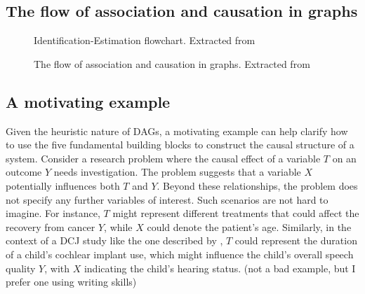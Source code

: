 \documentclass[
  authoryear,
  preprint,
  1p]{elsarticle}
\begin{document}
\subsection{The flow of association and causation in
graphs}\label{sec-framework-flow}

\begin{figure}


\caption{\label{fig-IEflow}Identification-Estimation flowchart.
Extracted from \citet[32]{Neal_2020}}

\end{figure}%

\begin{figure}


\caption{\label{fig-ACflow}The flow of association and causation in
graphs. Extracted from \citet[31]{Neal_2020}}

\end{figure}%

\subsection{A motivating example}\label{sec-framework-example}

Given the heuristic nature of DAGs, a motivating example can help
clarify how to use the five fundamental building blocks to construct the
causal structure of a system. Consider a research problem where the
causal effect of a variable \(T\) on an outcome \(Y\) needs
investigation. The problem suggests that a variable \(X\) potentially
influences both \(T\) and \(Y\). Beyond these relationships, the problem
does not specify any further variables of interest. Such scenarios are
not hard to imagine. For instance, \(T\) might represent different
treatments that could affect the recovery from cancer \(Y\), while \(X\)
could denote the patient's age. Similarly, in the context of a DCJ study
like the one described by \citet{Boonen_et_al_2020}, \(T\) could
represent the duration of a child's cochlear implant use, which might
influence the child's overall speech quality \(Y\), with \(X\)
indicating the child's hearing status. {(not a bad example, but I prefer
one using writing skills)}
\end{document}
